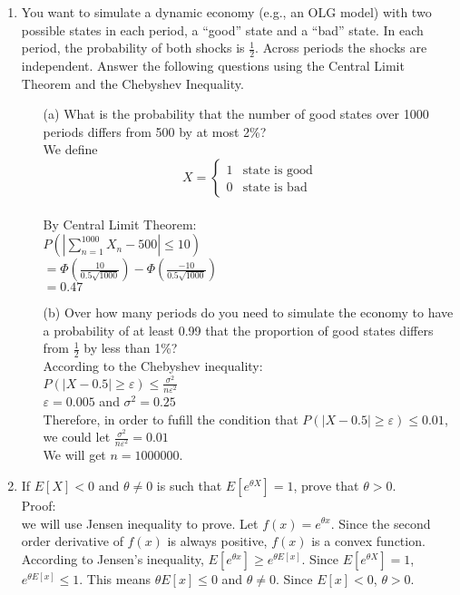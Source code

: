 \documentclass[letterpaper,12pt]{article}
\theoremstyle{definition}
\begin{document}
\begin{enumerate}
	\item You want to simulate a dynamic economy (e.g., an OLG model) with two possible states in each period, a ``good'' state and a ``bad'' state. In each period, the probability of both shocks is $\frac{1}{2}$. Across periods the shocks are independent. Answer the following questions using the Central Limit Theorem and the Chebyshev Inequality.
		\begin{itemize}
			\item[(a)] What is the probability that the number of good states over 1000 periods differs from 500 by at most 2\%?\\
 		           We define  
			 \begin{equation}
			       X = 
			        \begin{cases}
			            1 & \text{state is good} \\
			            0 & \text{state is bad}
			        \end{cases}
 			   \end{equation}\\
			By Central Limit Theorem:\\
			$P( | \sum_{n=1}^{1000} X_n - 500| \leq 10)$ \\
			$= \Phi (\frac{10}{0.5\sqrt{1000}}) - \Phi (\frac{-10}{0.5\sqrt{1000}})$\\
			$= 0.47$
			\item[(b)] Over how many periods do you need to simulate the economy to have a probability of at least 0.99 that the proportion of good states differs from $\frac{1}{2}$ by less than 1\%?\\
			According to the Chebyshev inequality:\\
			$P( | X - 0.5 | \geq \varepsilon) \leq \frac{\sigma^2}{n\varepsilon^2}$ \\
			$\varepsilon = 0.005$ and $\sigma^2 = 0.25$\\
			Therefore, in order to fufill the condition that $P( | X - 0.5 | \geq \varepsilon) \leq 0.01$, we could let $\frac{\sigma^2}{n\varepsilon^2} = 0.01$\\
			We will get $n = 1000000$.
		\end{itemize}

	\item If $E[X]<0$ and $\theta \neq 0$ is such that $E[e^{\theta X}]=1$, prove that $\theta > 0$.\\
	Proof: \\
	we will use Jensen inequality to prove. Let $f(x) = e^{\theta x}$. Since the second order derivative of $f(x)$ is always positive, $f(x)$ is a convex function. According to Jensen's inequality, $E[e^{\theta x}] \geq e^{\theta E[x]}$. Since $E[e^{\theta X}]=1$, $ e^{\theta E[x]} \leq 1$. This means $\theta E[x] \leq 0$ and $\theta \neq 0$. Since $E[x] < 0$, $\theta > 0$.
\end{enumerate}

\vspace{25mm}


\end{document}
